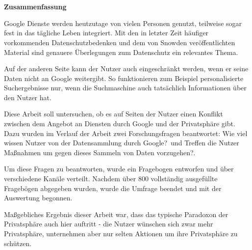 %
% 

\chapter*{\ }


\begin{center}
	\begin{large}
		\textbf{Zusammenfassung}
	\end{large}
\end{center}
\vspace{0.75em}
Google Dienste werden heutzutage von vielen Personen genutzt, teilweise sogar fest in das tägliche Leben integriert. 
Mit den in letzter Zeit häufiger vorkommenden Datenschutzbedenken und dem von Snowden veröffentlichten Material sind genauere Überlegungen zum Datenschutz ein relevantes Thema.

Auf der anderen Seite kann der Nutzer auch eingeschränkt werden, wenn er seine Daten nicht an Google weitergibt. So funktionieren zum Beispiel personalisierte Suchergebnisse nur, wenn die Suchmaschine auch tatsächlich Informationen über den Nutzer hat.

Diese Arbeit soll untersuchen, ob es auf Seiten der Nutzer einen Konflikt zwischen dem Angebot an Diensten durch Google und der Privatsphäre gibt. Dazu wurden im Verlauf der Arbeit zwei Forschungsfragen beantwortet: \glqq Wie viel wissen Nutzer von der Datensammlung durch Google?\grqq\ und \glqq Treffen die Nutzer Maßnahmen um gegen dieses Sammeln von Daten vorzugehen?\grqq .

Um diese Fragen zu beantworten, wurde ein Fragebogen entworfen und über verschiedene Kanäle verteilt. Nachdem über 800 vollständig ausgefüllte Fragebögen abgegeben wurden, wurde die Umfrage beendet und mit der Auswertung begonnen. 

Maßgebliches Ergebnis dieser Arbeit war, dass das typische Paradoxon der Privatsphäre auch hier auftritt - die Nutzer wünschen sich zwar mehr Privatsphäre, unternehmen aber nur selten Aktionen um ihre Privatsphäre zu schützen.

\chapter*{\ }

